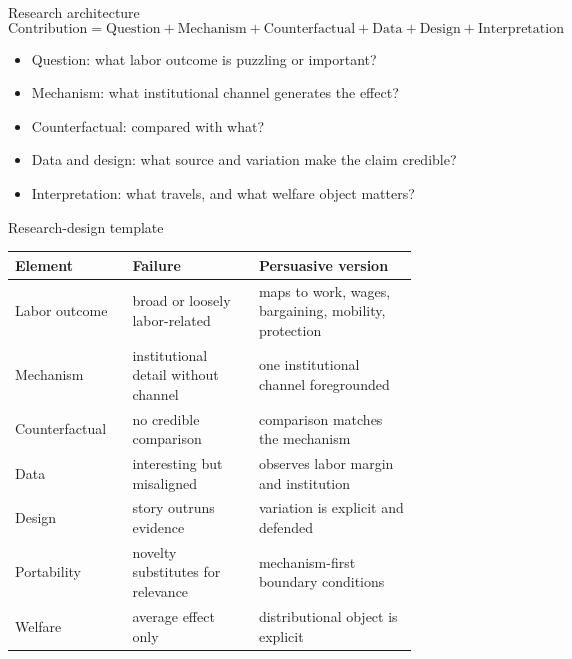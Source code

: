 \documentclass[aspectratio=169,11pt]{beamer}
\begin{document}
\begin{frame}{Research architecture}
\[
\text{Contribution} =
\text{Question} + \text{Mechanism} + \text{Counterfactual}
+ \text{Data} + \text{Design} + \text{Interpretation}
\]
\begin{itemize}
    \item Question: what labor outcome is puzzling or important?
    \item Mechanism: what institutional channel generates the effect?
    \item Counterfactual: compared with what?
    \item Data and design: what source and variation make the claim credible?
    \item Interpretation: what travels, and what welfare object matters?
\end{itemize}
\end{frame}

\begin{frame}{Research-design template}
\scriptsize
\begin{tabular}{p{0.19\linewidth} p{0.27\linewidth} p{0.34\linewidth}}
\toprule
Element & Failure & Persuasive version \\
\midrule
Labor outcome & broad or loosely labor-related & maps to work, wages, bargaining, mobility, protection \\
Mechanism & institutional detail without channel & one institutional channel foregrounded \\
Counterfactual & no credible comparison & comparison matches the mechanism \\
Data & interesting but misaligned & observes labor margin and institution \\
Design & story outruns evidence & variation is explicit and defended \\
Portability & novelty substitutes for relevance & mechanism-first boundary conditions \\
Welfare & average effect only & distributional object is explicit \\
\bottomrule
\end{tabular}
\end{frame}
\end{document}
